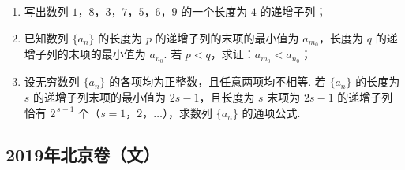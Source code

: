 \begin{description}
\begin{enumerate}[leftmargin=5pt]
\begin{enumerate}
\item 写出数列 \(1\)，\(8\)，\(3\)，\(7\)，\(5\)，\(6\)，\(9\) 的一个长度为 \(4\) 的递增子列；

\item 已知数列 \(\{a_n\}\) 的长度为 \(p\) 的递增子列的末项的最小值为 \(a_{m_0}\)，长度为 \(q\) 的递增子列的末项的最小值为 \(a_{n_0}\). 若 \(p<q\)，求证：\(a_{m_0}<a_{n_0}\)；

\item 设无穷数列 \(\{a_n\}\) 的各项均为正整数，且任意两项均不相等. 若 \(\{a_n\}\) 的长度为 \(s\) 的递增子列末项的最小值为 \(2s-1\)，且长度为 \(s\) 末项为 \(2s-1\) 的递增子列恰有 \(2^{\,s-1}\) 个（\(s=1\)，\(2\)，\(\dots\)），求数列 \(\{a_n\}\) 的通项公式.
\end{enumerate}

    \end{enumerate}

\end{description}


\subsection{2019年北京卷（文）}\label{gk:2019年北京卷（文）}

